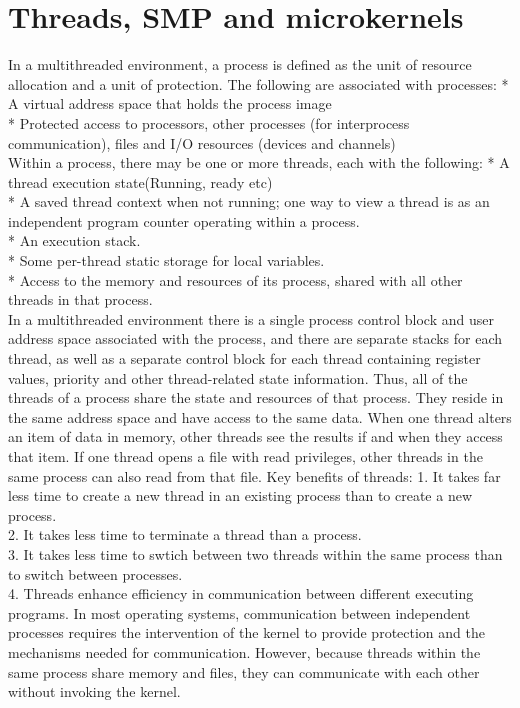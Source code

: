 \chapter{Threads, SMP and microkernels}

In a multithreaded environment, a process is defined as the unit of resource allocation and a unit of protection. The following are associated with processes:
* A virtual address space that holds the process image\\
* Protected access to processors, other processes (for interprocess communication), files and I/O resources (devices and channels)\\

Within a process, there may be one or more threads, each with the following:
* A thread execution state(Running, ready etc)\\
* A saved thread context when not running; one way to view a thread is as an independent program counter operating within a process.\\
* An execution stack.\\
* Some per-thread static storage for local variables.\\
* Access to the memory and resources of its process, shared with all other threads in that process.\\

In a multithreaded environment there is a single process control block and user address space associated with the process, and there are separate stacks for each thread, as well as a separate control block for each thread containing register values, priority and other thread-related state information.
Thus, all of the threads of a process share the state and resources of that process. They reside in the same address space and have access to the same data. When one thread alters an item of data in memory, other threads see the results if and when they access that item. If one thread opens a file with read privileges, other threads in the same process can also read from that file.
Key benefits of threads:
1. It takes far less time to create a new thread in an existing process than to create a new process.\\
2. It takes less time to terminate a thread than a process.\\
3. It takes less time to swtich between two threads within the same process than to switch between processes.\\
4. Threads enhance efficiency in communication between different executing programs. In most operating systems, communication between independent processes requires the intervention of the kernel to provide protection and the mechanisms needed for communication. However, because threads within the same process share memory and files, they can communicate with each other without invoking the kernel.\\


